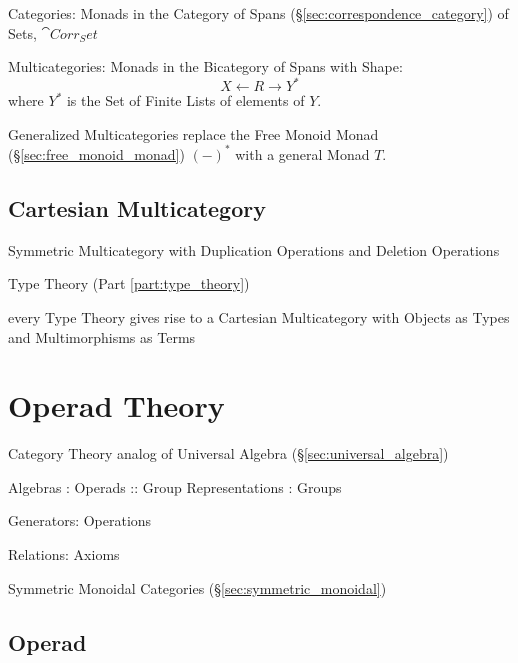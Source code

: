 Categories: Monads in the Category of Spans
(\S\ref{sec:correspondence_category}) of Sets, $\cat{Corr_Set}$

Multicategories: Monads in the Bicategory of Spans with Shape:
\[
  X \leftarrow R \rightarrow Y^*
\]
where $Y^*$ is the Set of Finite Lists of elements of $Y$.

Generalized Multicategories replace the Free Monoid Monad
(\S\ref{sec:free_monoid_monad}) $(-)^*$ with a general Monad $T$.



\subsection{Cartesian Multicategory}
\label{sec:cartesian_multicategory}

Symmetric Multicategory with Duplication Operations and Deletion
Operations

Type Theory (Part \ref{part:type_theory})

every Type Theory gives rise to a Cartesian Multicategory with Objects
as Types and Multimorphisms as Terms



\section{Operad Theory}\label{sec:operad_theory}

Category Theory analog of Universal Algebra
(\S\ref{sec:universal_algebra})

Algebras : Operads :: Group Representations : Groups

Generators: Operations

Relations: Axioms

Symmetric Monoidal Categories
(\S\ref{sec:symmetric_monoidal})



\subsection{Operad}\label{sec:operad}

